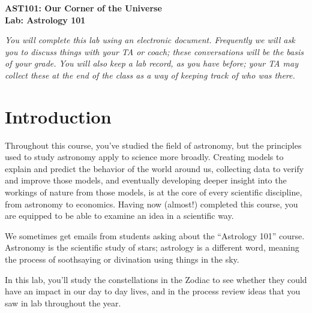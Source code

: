 \documentclass[11pt]{article}
\begin{document}
\begin{center}
\textbf{\Large
AST101: Our Corner of the Universe \\
\vspace*{0.1cm}
Lab: Astrology 101
}
\vspace{1em}


{\it You will complete this lab using an electronic document. Frequently we will ask you to discuss things with your TA or coach; these conversations will be the basis of your grade. You will also keep a lab record, as you have before; your TA may collect these at the end of the class as a way of keeping track of who was there.}

\end{center}

\vspace*{0.5cm}



\section{Introduction}

Throughout this course, you've studied the field of astronomy, but the principles used to study astronomy apply to science more broadly. Creating models to explain and predict the behavior of the world around us, collecting data to verify and improve those models, and eventually developing deeper insight into the workings of nature from those models, is at the core of every scientific discipline, from astronomy to economics. Having now (almost!) completed this course, you are equipped to be able to examine an idea in a scientific way. 

We sometimes get emails from students asking about the ``Astrology 101'' course. Astronomy is the scientific study of stars; astrology is a different word, meaning the process of soothsaying or divination using things in the sky.

In this lab, you'll study the constellations in the Zodiac to see whether they could have an impact in our day to day lives, and in the process review ideas that you saw in lab throughout the year. \\ \\ \\

\end{document}
